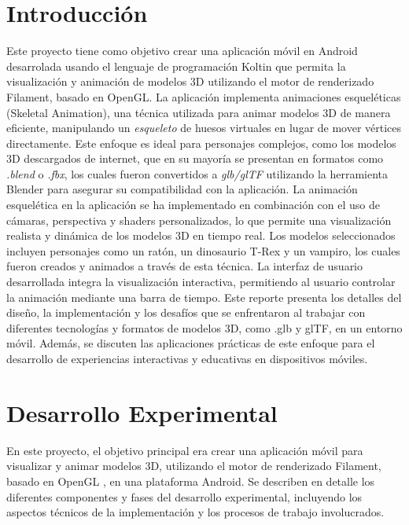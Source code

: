 \documentclass[conference]{IEEEtran}
\begin{document}

\section{Introducción}  
Este proyecto tiene como objetivo crear una aplicación móvil en Android \cite{android-dev} desarrolada usando el lenguaje de programación Koltin \cite{kotlin} que permita la visualización y animación de modelos 3D utilizando el motor de renderizado Filament, basado en OpenGL. \cite{opengl} La aplicación implementa animaciones esqueléticas (Skeletal Animation), una técnica utilizada para animar modelos 3D de manera eficiente, manipulando un \textit{esqueleto} de huesos virtuales en lugar de mover vértices directamente. Este enfoque es ideal para personajes complejos, como los modelos 3D descargados de internet, que en su mayoría se presentan en formatos como \textit{.blend} o \textit{.fbx}, los cuales fueron convertidos a \textit{glb/glTF} utilizando la herramienta Blender para asegurar su compatibilidad con la aplicación.
La animación esquelética en la aplicación se ha implementado en combinación con el uso de cámaras, perspectiva y shaders personalizados, lo que permite una visualización realista y dinámica de los modelos 3D en tiempo real. Los modelos seleccionados incluyen personajes como un ratón, un dinosaurio T-Rex y un vampiro, los cuales fueron creados y animados a través de esta técnica. La interfaz de usuario desarrollada integra la visualización interactiva, permitiendo al usuario controlar la animación mediante una barra de tiempo.
Este reporte presenta los detalles del diseño, la implementación y los desafíos que se enfrentaron al trabajar con diferentes tecnologías y formatos de modelos 3D, como .glb y glTF, en un entorno móvil. Además, se discuten las aplicaciones prácticas de este enfoque para el desarrollo de experiencias interactivas y educativas en dispositivos móviles. \cite{androidTutorial}


\section{Desarrollo Experimental}

En este proyecto, el objetivo principal era crear una aplicación móvil para visualizar y animar modelos 3D, utilizando el motor de renderizado Filament, basado en OpenGL \cite{opengles}, en una plataforma Android. Se describen en detalle los diferentes componentes y fases del desarrollo experimental, incluyendo los aspectos técnicos de la implementación y los procesos de trabajo involucrados.
\end{document}

